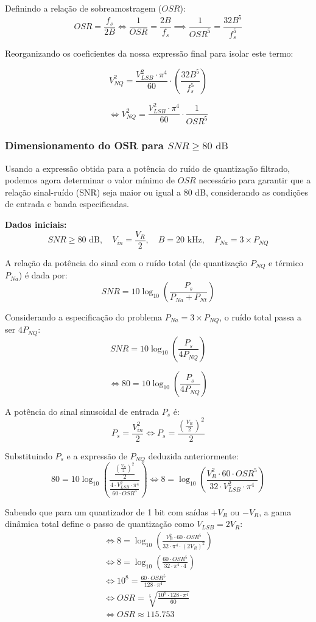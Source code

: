 Definindo a relação de sobreamostragem ($OSR$):
\[ OSR = \frac{f_s}{2B} \iff \frac{1}{OSR} = \frac{2B}{f_s} \implies \frac{1}{OSR^5} = \frac{32B^5}{f_s^5} \]

Reorganizando os coeficientes da nossa expressão final para isolar este termo:

\[ V_{NQ}^2 = \frac{V_{LSB}^2 \cdot \pi^4}{60} \cdot \left(\frac{32B^5}{f_s^5}\right) \]

\[ \iff V_{NQ}^2 = \frac{V_{LSB}^2 \cdot \pi^4}{60} \cdot \frac{1}{OSR^5} \]


\vspace{0.5cm}
\subsubsection{Dimensionamento do OSR para $SNR \ge 80 \text{ dB}$}
Usando a expressão obtida para a potência do ruído de quantização filtrado, podemos agora determinar o valor
mínimo de $OSR$ necessário para garantir que a relação sinal-ruído (SNR) seja maior ou igual a 80 dB,
considerando as condições de entrada e banda especificadas.

\textbf{Dados iniciais:}
\[ SNR \ge 80 \text{ dB}, \quad V_{in} = \frac{V_R}{2}, \quad B = 20 \text{ kHz}, \quad P_{Na} = 3 \times P_{NQ}\]

A relação da potência do sinal com o ruído total (de quantização $P_{NQ}$ e térmico $P_{Na}$) é dada por:
\[ SNR = 10 \log_{10} \left( \frac{P_s}{P_{Na} + P_{Nt}} \right) \]

Considerando a especificação do problema $P_{Na} = 3 \times P_{NQ}$, o ruído total passa a ser $4 P_{NQ}$:
\[ SNR = 10 \log_{10} \left( \frac{P_s}{4 P_{NQ}} \right) \]

\[ \iff 80 = 10 \log_{10} \left( \frac{P_s}{4 P_{NQ}} \right) \]

A potência do sinal sinusoidal de entrada $P_s$ é:
\[ P_s = \frac{V_{in}^2}{2} \iff P_s = \frac{\left(\frac{V_R}{2}\right)^2}{2} \]

Substituindo $P_s$ e a expressão de $P_{NQ}$ deduzida anteriormente:
\[ 80 = 10 \log_{10} \left( \frac{\frac{\left(\frac{V_R}{2}\right)^2}{2}}{\frac{4 \cdot V_{LSB}^2 \cdot \pi^4}{60 \cdot OSR^5}} \right) \iff 8 = \log_{10} \left( \frac{V_R^2 \cdot 60 \cdot OSR^5}{32 \cdot V_{LSB}^2 \cdot \pi^4} \right) \]

Sabendo que para um quantizador de 1 bit com saídas $+V_R$ ou $-V_R$, a gama dinâmica total define o passo de quantização como $V_{LSB} = 2V_R$:
\begin{gather*}
    \iff 8 = \log_{10} \left( \frac{V_R^2 \cdot 60 \cdot OSR^5}{32 \cdot \pi^4 \cdot (2V_R)^2} \right) \\[2ex]
    \iff 8 = \log_{10} \left( \frac{60 \cdot OSR^5}{32 \cdot \pi^4 \cdot 4} \right) \\[2ex]
    \iff 10^8 = \frac{60 \cdot OSR^5}{128 \cdot \pi^4} \\[2ex]
    \iff OSR = \sqrt[5]{\frac{10^8 \cdot 128 \cdot \pi^4}{60}} \\[2ex]
    \iff OSR \approx 115.753
\end{gather*}




